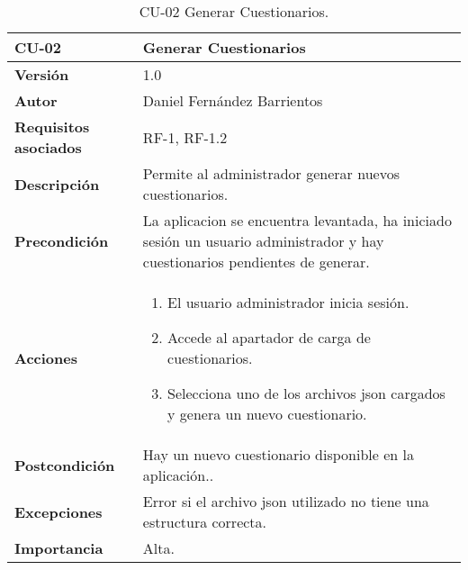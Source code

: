 \begin{table}[p]
	\centering
	\begin{tabularx}{\linewidth}{ p{} p{} }
		\toprule
		\textbf{CU-02}    & \textbf{Generar Cuestionarios}\\
		\toprule
		\textbf{Versión}              & 1.0    \\
		\textbf{Autor}                & Daniel Fernández Barrientos \\
		\textbf{Requisitos asociados} & RF-1, RF-1.2 \\
		\textbf{Descripción}          & Permite al administrador generar nuevos cuestionarios. \\
		\textbf{Precondición}         & La aplicacion se encuentra levantada, ha iniciado sesión un usuario administrador y hay cuestionarios pendientes de generar. \\
		\textbf{Acciones}             &
		\begin{enumerate}
			\def\labelenumi{\arabic{enumi}.}
			\tightlist
			\item El usuario administrador inicia sesión.
			\item Accede al apartador de carga de cuestionarios.
			\item Selecciona uno de los archivos json cargados y genera un nuevo cuestionario.
		\end{enumerate}\\
		\textbf{Postcondición}        & Hay un nuevo cuestionario disponible en la aplicación.. \\
		\textbf{Excepciones}          & Error si el archivo json utilizado no tiene una estructura correcta. \\
		\textbf{Importancia}          & Alta. \\
		\bottomrule
	\end{tabularx}
	\caption{CU-02 Generar Cuestionarios.}
\end{table}

